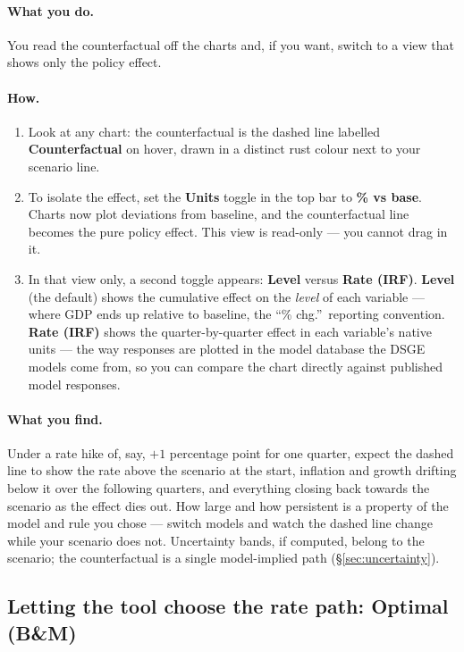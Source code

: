 \documentclass[11pt]{article}
\theoremstyle{definition}
\theoremstyle{remark}
\begin{document}
\paragraph{What you do.} You read the counterfactual off the charts and, if
you want, switch to a view that shows only the policy effect.

\paragraph{How.}
\begin{enumerate}
  \item Look at any chart: the counterfactual is the dashed line labelled
    \textbf{Counterfactual} on hover, drawn in a distinct rust colour next to
    your scenario line.
  \item To isolate the effect, set the \textbf{Units} toggle in the top bar to
    \textbf{\% vs base}. Charts now plot deviations from baseline, and the
    counterfactual line becomes the pure policy effect. This view is
    read-only --- you cannot drag in it.
  \item In that view only, a second toggle appears: \textbf{Level} versus
    \textbf{Rate (IRF)}. \textbf{Level} (the default) shows the cumulative
    effect on the \emph{level} of each variable --- where GDP ends up
    relative to baseline, the ``\% chg.''\ reporting convention.
    \textbf{Rate (IRF)} shows the quarter-by-quarter effect in each
    variable's native units --- the way responses are plotted in the model
    database the DSGE models come from, so you can compare the chart directly
    against published model responses.
\end{enumerate}

\paragraph{What you find.} Under a rate hike of, say, $+1$ percentage point
for one quarter, expect the dashed line to show the rate above the scenario
at the start, inflation and growth drifting below it over the following
quarters, and everything closing back towards the scenario as the effect dies
out. How large and how persistent is a property of the model and rule you
chose --- switch models and watch the dashed line change while your scenario
does not. Uncertainty bands, if computed, belong to the scenario; the
counterfactual is a single model-implied path (\S\ref{sec:uncertainty}).

\subsection{Letting the tool choose the rate path: Optimal (B\&M)}
\end{document}
